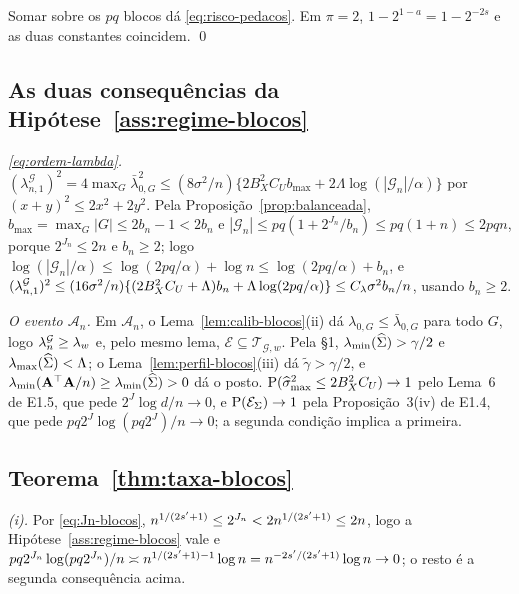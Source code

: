 \documentclass[11pt,a4paper]{article}
\newcommand{\lmin}{\lambda_{\min}}
\newcommand{\lmaxx}{\lambda_{\max}}
\newcommand{\Amat}{\mathbf{A}}
\newcommand{\smax}{\widehat{\sigma}_{\max}}
\newcommand{\gtil}{\widetilde{\gamma}}
\newcommand{\Gcal}{\mathcal{G}}
\newcommand{\bn}{b_{n}}
\newcommand{\lamG}{\lambda^{\mathcal{G}}_{n}}
\newcommand{\lamGone}{\lambda^{\mathcal{G}}_{n,1}}
\newcommand{\lamz}[1]{\lambda_{0,#1}}
\newcommand{\lamzbar}[1]{\bar{\lambda}_{0,#1}}
\newcommand{\Tw}{\mathcal{T}_{\mathcal{G},w}}
\newcommand{\Ecal}{\mathcal{E}}
\newcommand{\ESig}{\mathcal{E}_{\Sigma}}
\newcommand{\Acal}{\mathcal{A}_{n}}
\begin{document}
Somar sobre os $pq$ blocos dá \eqref{eq:risco-pedacos}. Em $\pi = 2$,
$1 - 2^{1-a} = 1 - 2^{-2s}$ e as duas constantes coincidem. \qed

\subsection*{As duas consequências da Hipótese~\ref{ass:regime-blocos}}

\emph{\eqref{eq:ordem-lambda}.} $(\lamGone)^{2} = 4\max_{G}\lamzbar{G}^{2}
\le (8\sigma^{2}/n)\{2B_{X}^{2}C_{U}b_{\max} + 2\Lambda\log(|\Gcal_{n}|/\alpha)\}$
por $(x+y)^{2} \le 2x^{2}+2y^{2}$. Pela Proposição~\ref{prop:balanceada},
$b_{\max} = \max_{G}|G| \le 2\bn - 1 < 2\bn$ e $|\Gcal_{n}| \le pq(1 +
2^{J_{n}}/\bn) \le pq(1+n) \le 2pqn$, porque $2^{J_{n}} \le 2n$ e
$\bn \ge 2$; logo $\log(|\Gcal_{n}|/\alpha) \le \log(2pq/\alpha) + \log n
\le \log(2pq/\alpha) + \bn$, e
$(\lamGone)^{2} \le (16\sigma^{2}/n)\{(2B_{X}^{2}C_{U} + \Lambda)\bn +
\Lambda\log(2pq/\alpha)\} \le C_{\pen}\sigma^{2}\bn/n$, usando $\bn \ge 2$.

\emph{O evento $\Acal$.} Em $\Acal$, o Lema~\ref{lem:calib-blocos}(ii) dá
$\lamz{G} \le \lamzbar{G}$ para todo $G$, logo $\lamG \ge \pen_{w}$ e, pelo
mesmo lema, $\Ecal \subseteq \Tw$. Pela §1, $\lmin(\Gramhat) > \gamma/2$ e
$\lmaxx(\Gramhat) < \Lambda$; o Lema~\ref{lem:perfil-blocos}(iii) dá
$\gtil > \gamma/2$, e $\lmin(\Amat\T\Amat/n) \ge \lmin(\Gramhat) > 0$ dá o
posto. $\Prob(\smax^{2} \le 2B_{X}^{2}C_{U}) \to 1$ pelo Lema~6 de E1.5,
que pede $2^{J}\log d/n \to 0$, e $\Prob(\ESig) \to 1$ pela
Proposição~3(iv) de E1.4, que pede $pq2^{J}\log(pq2^{J})/n \to 0$; a segunda
condição implica a primeira.

\subsection*{Teorema~\ref{thm:taxa-blocos}}

\emph{(i).} Por \eqref{eq:Jn-blocos}, $n^{1/(2s'+1)} \le 2^{J_{n}} <
2n^{1/(2s'+1)} \le 2n$, logo a Hipótese~\ref{ass:regime-blocos} vale e
$pq2^{J_{n}}\log(pq2^{J_{n}})/n \asymp n^{1/(2s'+1)-1}\log n =
n^{-2s'/(2s'+1)}\log n \to 0$; o resto é a segunda consequência acima.
\end{document}
